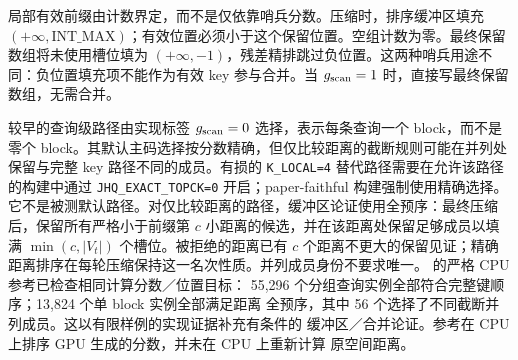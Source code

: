 局部有效前缀由计数界定，而不是仅依靠哨兵分数。压缩时，排序缓冲区填充 $(+\infty,\mathrm{INT\_MAX})$；有效位置必须小于这个保留位置。空组计数为零。最终保留数组将未使用槽位填为 $(+\infty,-1)$，残差精排跳过负位置。这两种哨兵用途不同：负位置填充项不能作为有效 key 参与合并。当 $g_{\mathrm{scan}}=1$ 时，直接写最终保留数组，无需合并。

较早的查询级路径由实现标签 $g_{\mathrm{scan}}=0$ 选择，表示每条查询一个 block，而不是零个 block。其默认主码选择按分数精确，但仅比较距离的截断规则可能在并列处保留与完整 key 路径不同的成员。有损的 \texttt{K\_LOCAL=4} 替代路径需要在允许该路径的构建中通过 \texttt{JHQ\_EXACT\_TOPCK=0} 开启；paper-faithful 构建强制使用精确选择。它不是被测默认路径。对仅比较距离的路径，缓冲区论证使用全预序：最终压缩后，保留所有严格小于前缀第 $c$ 小距离的候选，并在该距离处保留足够成员以填满 $\min(c,|V_t|)$ 个槽位。被拒绝的距离已有 $c$ 个距离不更大的保留见证；精确距离排序在每轮压缩保持这一名次性质。并列成员身份不要求唯一。
 的严格 CPU 参考已检查相同计算分数／位置目标：
55,296 个分组查询实例全部符合完整键顺序；13,824 个单 block 实例全部满足距离
全预序，其中 56 个选择了不同截断并列成员。这以有限样例的实现证据补充有条件的
缓冲区／合并论证。参考在 CPU 上排序 GPU 生成的分数，并未在 CPU 上重新计算
原空间距离。
